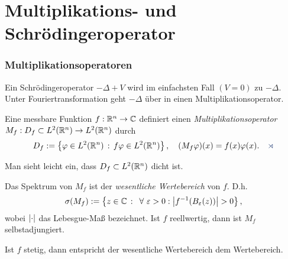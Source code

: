 \chapter{Multiplikations- und Schrödingeroperator}

\subsection{Multiplikationsoperatoren}
Ein Schrödingeroperator $-\Delta + V$ wird im einfachsten Fall $(V=0)$ zu
$-\Delta$. Unter Fouriertransformation geht $-\Delta$ über in einen
Multiplikationsoperator.

\begin{defn*}
Eine messbare Funktion $f: \mathbb{R}^n\to \mathbb{C}$ definiert einen
\emph{Multiplikationsoperator}
$
M_f : D_f \subset L^2(\mathbb{R}^n)\to L^2(\mathbb{R}^n)
$
durch
\begin{align*}
D_f := \setdef{\ph\in L^2(\R^n)}{f\ph\in L^2(\R^n)},\quad
(M_f\ph)(x) = f(x)\ph(x).\fishhere
\end{align*}
\end{defn*}
Man sieht leicht ein, dass $D_f\subset L^2(\mathbb{R}^n)$ dicht ist. 

\begin{prop}
\label{prop:5.1}
Das Spektrum von $M_f$ ist der \emph{wesentliche Wertebereich} von $f$. D.h.
\begin{align*}
\sigma(M_f) := \setdef{z\in \C}{\forall \ep >0 : \abs{f^{-1}(B_\ep(z))}>
0},
\end{align*}
wobei $\left|\cdot\right|$ das Lebesgue-Maß  bezeichnet. Ist $f$ reellwertig, dann ist
$M_f$ selbstadjungiert.\fishhere
\end{prop}

Ist $f$ stetig, dann entspricht der wesentliche Wertebereich dem Wertebereich.

